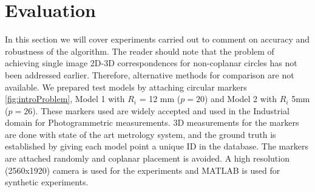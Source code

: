\documentclass{bmvc2k}
\begin{document}
\section{Evaluation}
In this section we will cover experiments carried out to comment on accuracy and robustness of the algorithm. 
The reader should note that the problem of achieving single image 2D-3D correspondences for non-coplanar circles has not been addressed earlier. 
Therefore, alternative methods for comparison are not available. 
We prepared test models by attaching circular markers \ref{fig:introProblem}, Model 1 with $ R_i $ = 12 mm ($ p = 20 $) and Model 2 with $ R_i $ 5mm ($ p = 26$). These markers used are widely accepted and used in the Industrial domain for Photogrammetric measurements.     
3D measurements for the markers are done with state of the art metrology system, and the ground truth is established by giving each model point a unique ID in the database. 
The markers are attached randomly and coplanar placement is avoided. 
A high resolution (2560x1920) camera is used for the experiments and MATLAB is used for synthetic experiments. 
\end{document}
